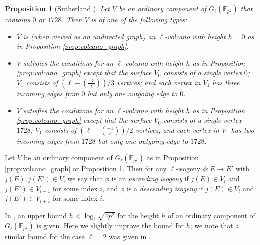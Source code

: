 \documentclass{article}
\newtheorem{proposition}[theorem]{Proposition}
\theoremstyle{definition}
\newcommand{\FF}{\mathbb{F}}
\begin{document}
\begin{proposition}
[{Sutherland \cite[Remark 8]{Sutherland:ANTSX}}]
\label{prop:volcano_graph_0_1728}
Let $V$ be an ordinary component of $G_{\ell}(\FF_{p^2})$ that contains $0$ or $1728$.
Then $V$ is of one of the following types:
\begin{itemize}
\item
$V$ is (when viewed as an undirected graph) an $\ell$-volcano with height $h = 0$ as in Proposition \ref{prop:volcano_graph}.
\item
$V$ satisfies the conditions for an $\ell$-volcano with height $h$ as in Proposition \ref{prop:volcano_graph} except that the surface $V_0$ consists of a single vertex $0$; $V_1$ consists of $(\ell - (\frac{-3}{\ell})) / 3$ vertices; and each vertex in $V_1$ has three incoming edges from $0$ but only one outgoing edge to $0$.
\item
$V$ satisfies the conditions for an $\ell$-volcano with height $h$ as in Proposition \ref{prop:volcano_graph} except that the surface $V_0$ consists of a single vertex $1728$; $V_1$ consists of $(\ell - (\frac{-1}{\ell})) / 2$ vertices; and each vertex in $V_1$ has two incoming edges from $1728$ but only one outgoing edge to $1728$.
\end{itemize}
\end{proposition}

Let $V$ be an ordinary component of $G_{\ell}(\FF_{p^2})$ as in Proposition \ref{prop:volcano_graph} or Proposition \ref{prop:volcano_graph_0_1728}.
Then for any $\ell$-isogeny $\phi \colon E \to E'$ with $j(E),j(E') \in V$, we say that $\phi$ is an \emph{ascending isogeny} if $j(E) \in V_i$ and $j(E') \in V_{i-1}$ for some index $i$, and $\phi$ is a \emph{descending isogeny} if $j(E) \in V_i$ and $j(E') \in V_{i+1}$ for some index $i$.

In \cite[Equation (2)]{DBLP:journals/lmsjcm/Sutherland12a}, an upper bound $h < \log_{\ell} \sqrt{4p^2}$ for the height $h$ of an ordinary component of $G_{\ell}(\FF_{p^2})$ is given.
Here we slightly improve the bound for $h$; we note that a similar bound for the case $\ell = 2$ was given in \cite{hashimoto2024boundsheights2isogenygraphs}.
\end{document}

